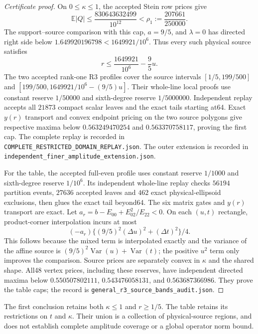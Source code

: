\begin{proof}[Certificate proof]
On $0\leq\kappa\leq1$, the accepted Stein row prices give
\[
 \mathbb E|Q|\leq\frac{830643632499}{10^{12}}
 <\rho_1:=\frac{207661}{250000}.
\]
The support--source comparison with this cap, $a=9/5$, and
$\lambda=0$ has directed right side below
$1.649920196798<1649921/10^6$.  Thus every such physical
source satisfies
\[
 r\leq\frac{1649921}{10^6}-\frac95u.
\]
The two accepted rank-one R3 profiles cover the source intervals
$[1/5,199/500]$ and
$[199/500,1649921/10^6-(9/5)u]$.  Their whole-line local proofs use
constant reserve $1/50000$ and sixth-degree reserve $1/5000000$.
Independent replay accepts all $21873$ compact scalar leaves and the
exact tails starting at64.  Exact $y(r)$ transport and convex
endpoint pricing on the two source polygons give respective maxima
below $0.563249470254$ and $0.563370758117$, proving the first cap.
The complete replay is recorded in
\texttt{COMPLETE\_\allowbreak RESTRICTED\_\allowbreak DOMAIN\_\allowbreak REPLAY.json}.
The outer extension is recorded in
\texttt{independent\_\allowbreak finer\_\allowbreak amplitude\_\allowbreak extension.json}.

For the table, the accepted full-even profile uses constant reserve
$1/1000$ and sixth-degree reserve $1/10^6$.
Its independent whole-line replay checks $56194$ partition events,
$27636$ accepted leaves and $462$ exact physical-ellipsoid exclusions,
then glues the exact tail beyond64.  The six matrix gates and
$y(r)$ transport are exact.  Let
$a_r=b-E_{00}+E_{02}^2/E_{22}<0$.  On each $(u,t)$ rectangle,
product-corner interpolation incurs at most
\[
 (-a_r)\{(9/5)^2(\Delta u)^2+(\Delta t)^2\}/4.
\]
This follows because the mixed term is interpolated exactly and the
variance of the affine source is $(9/5)^2\operatorname{Var}(u)+
\operatorname{Var}(t)$; the positive $u^2$ term only improves the
comparison.  Source prices are separately convex in $\kappa$ and
the shared shape.  All48 vertex prices, including these reserves,
have independent directed maxima below
$0.550507802111$, $0.543476058131$, and $0.563687366986$.
They prove the table caps; the record is
\texttt{general\_r3\_source\_bands\_audit.json}.
\end{proof}
The first conclusion retains both $\kappa\leq1$ and $r\geq1/5$.
The table retains its restrictions on $t$ and $\kappa$.
Their union is a collection of physical-source regions, and does not
establish complete amplitude coverage or a global operator norm bound.
